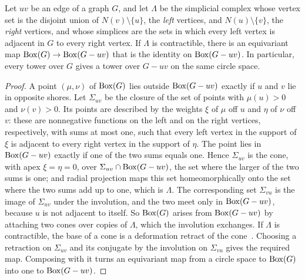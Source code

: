 \begin{lemma}\label{lem:link}
Let $uv$ be an edge of a graph $G$, and let $\Lambda$ be the simplicial complex whose vertex set is the disjoint union of $N(v)\setminus\{u\}$, the \emph{left} vertices, and $N(u)\setminus\{v\}$, the \emph{right} vertices, and whose simplices are the sets in which every left vertex is adjacent in $G$ to every right vertex. If $\Lambda$ is contractible, there is an equivariant map $\operatorname{Box}(G)\to\operatorname{Box}(G-uv)$ that is the identity on $\operatorname{Box}(G-uv)$. In particular, every tower over $G$ gives a tower over $G-uv$ on the same circle space.
\end{lemma}
\begin{proof}
A point $(\mu,\nu)$ of $\operatorname{Box}(G)$ lies outside $\operatorname{Box}(G-uv)$ exactly if $u$ and $v$ lie in opposite shores. Let $\Sigma_{uv}$ be the closure of the set of points with $\mu(u)>0$ and $\nu(v)>0$. Its points are described by the weights $\xi$ of $\mu$ off $u$ and $\eta$ of $\nu$ off $v$: these are nonnegative functions on the left and on the right vertices, respectively, with sums at most one, such that every left vertex in the support of $\xi$ is adjacent to every right vertex in the support of $\eta$. The point lies in $\operatorname{Box}(G-uv)$ exactly if one of the two sums equals one. Hence $\Sigma_{uv}$ is the cone, with apex $\xi=\eta=0$, over $\Sigma_{uv}\cap\operatorname{Box}(G-uv)$, the set where the larger of the two sums is one; and radial projection maps this set homeomorphically onto the set where the two sums add up to one, which is $\Lambda$. The corresponding set $\Sigma_{vu}$ is the image of $\Sigma_{uv}$ under the involution, and the two meet only in $\operatorname{Box}(G-uv)$, because $u$ is not adjacent to itself. So $\operatorname{Box}(G)$ arises from $\operatorname{Box}(G-uv)$ by attaching two cones over copies of $\Lambda$, which the involution exchanges. If $\Lambda$ is contractible, the base of a cone is a deformation retract of the cone~\cite[Chapter~0]{Hatcher}. Choosing a retraction on $\Sigma_{uv}$ and its conjugate by the involution on $\Sigma_{vu}$ gives the required map. Composing with it turns an equivariant map from a circle space to $\operatorname{Box}(G)$ into one to $\operatorname{Box}(G-uv)$.
\end{proof}

